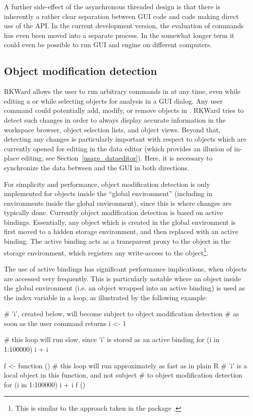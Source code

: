 A further side-effect of the asynchronous threaded design is that there is
inherently a rather clear separation between GUI code and code making direct use
of the  API. In the current development version, the evaluation
of  commands has even been moved into a separate process. In the somewhat longer term it could even
be possible to run GUI and  engine on different computers.

\subsection[technical_omd]{Object modification detection}
RKWard allows the user to run arbitrary commands in  at any time, even while
editing a  or while selecting objects for analysis in a GUI dialog. Any user
command could potentially add, modify, or remove objects in . RKWard tries to
detect such changes in order to always display accurate information in the
workspace browser, object selection lists, and object views. Beyond that,
detecting any changes is particularly important with respect to objects which
are currently opened for editing in the data editor (which provides an illusion
of in-place editing, see Section~\ref{usage_dataeditor}). Here, it is necessary to synchronize
the data between  and the GUI in both directions.

For simplicity and performance, object modification detection is only
implemented for objects inside the ``global environment'' (including in environments
inside the global environment), since this is where changes are typically done.
Currently object modification detection is based on active bindings.
Essentially, any object which is created in the global environment is first
moved to a hidden storage environment, and then replaced with an active binding.
The active binding acts as a transparent proxy to the object in the storage
environment, which registers any write-access to the object\footnote{
    This is similar to the approach taken in the  package \citep{Plate2009}.
}.

The use of active bindings has significant performance implications, when
objects are accessed very frequently. This is particularly notable where an
object inside the global environment (i.e. an object wrapped into an active
binding) is used as the index variable in a loop, as illustrated by the
following example:

\begin{Code}
# 'i', created below, will become subject to object modification detection
# as soon as the user command returns
i <- 1

# this loop will run slow, since 'i' is stored as an active binding
for (i in 1:100000) i + i

f <- function () {
    # this loop will run approximately as fast as in plain R
    # 'i' is a local object in this function, and not subject
    # to object modification detection
    for (i in 1:100000) i + i
}
f ()
\end{Code}


